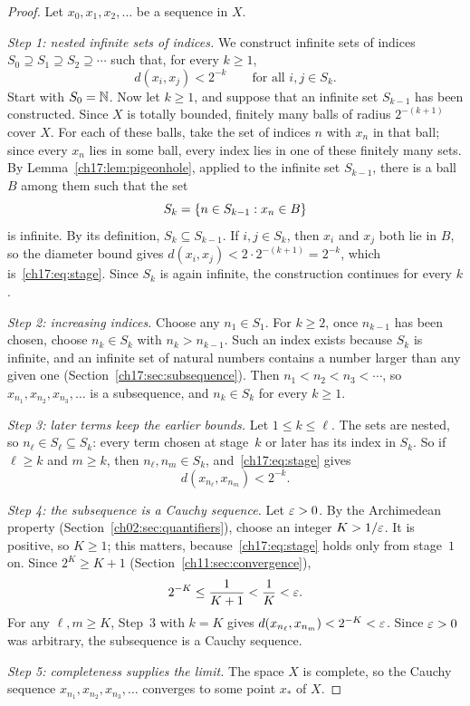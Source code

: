 \begin{proof}
Let $x_0,x_1,x_2,\ldots$ be a sequence in $X$.

\emph{Step 1: nested infinite sets of indices.} We construct infinite sets of indices $S_0\supseteq S_1\supseteq S_2\supseteq\cdots$ such that, for every $k\ge1$,
\begin{equation}\label{ch17:eq:stage}
 d(x_i,x_j)<2^{-k}\qquad\text{for all }i,j\in S_k.
\end{equation}
Start with $S_0=\mathbb N$. Now let $k\ge1$, and suppose that an infinite set $S_{k-1}$ has been constructed. Since $X$ is totally bounded, finitely many balls of radius $2^{-(k+1)}$ cover $X$. For each of these balls, take the set of indices $n$ with $x_n$ in that ball; since every $x_n$ lies in some ball, every index lies in one of these finitely many sets. By Lemma~\ref{ch17:lem:pigeonhole}, applied to the infinite set $S_{k-1}$, there is a ball $B$ among them such that the set
\[
 S_k=\left\{n\in S_{k-1}:x_n\in B\right\}
\]
is infinite. By its definition, $S_k\subseteq S_{k-1}$. If $i,j\in S_k$, then $x_i$ and $x_j$ both lie in $B$, so the diameter bound gives $d(x_i,x_j)<2\cdot2^{-(k+1)}=2^{-k}$, which is~\eqref{ch17:eq:stage}. Since $S_k$ is again infinite, the construction continues for every $k$.

\emph{Step 2: increasing indices.} Choose any $n_1\in S_1$. For $k\ge2$, once $n_{k-1}$ has been chosen, choose $n_k\in S_k$ with $n_k>n_{k-1}$. Such an index exists because $S_k$ is infinite, and an infinite set of natural numbers contains a number larger than any given one (Section~\ref{ch17:sec:subsequence}). Then $n_1<n_2<n_3<\cdots$, so $x_{n_1},x_{n_2},x_{n_3},\ldots$ is a subsequence, and $n_k\in S_k$ for every $k\ge1$.

\emph{Step 3: later terms keep the earlier bounds.} Let $1\le k\le\ell$. The sets are nested, so $n_\ell\in S_\ell\subseteq S_k$: every term chosen at stage~$k$ or later has its index in $S_k$. So if $\ell\ge k$ and $m\ge k$, then $n_\ell,n_m\in S_k$, and~\eqref{ch17:eq:stage} gives
\[
 d(x_{n_\ell},x_{n_m})<2^{-k}.
\]

\emph{Step 4: the subsequence is a Cauchy sequence.} Let $\varepsilon>0$. By the Archimedean property (Section~\ref{ch02:sec:quantifiers}), choose an integer $K>1/\varepsilon$. It is positive, so $K\ge1$; this matters, because~\eqref{ch17:eq:stage} holds only from stage~$1$ on. Since $2^K\ge K+1$ (Section~\ref{ch11:sec:convergence}),
\[
 2^{-K}\le\frac1{K+1}<\frac1K<\varepsilon.
\]
For any $\ell,m\ge K$, Step~3 with $k=K$ gives $d(x_{n_\ell},x_{n_m})<2^{-K}<\varepsilon$. Since $\varepsilon>0$ was arbitrary, the subsequence is a Cauchy sequence.

\emph{Step 5: completeness supplies the limit.} The space $X$ is complete, so the Cauchy sequence $x_{n_1},x_{n_2},x_{n_3},\ldots$ converges to some point $x_*$ of $X$.
\end{proof}

